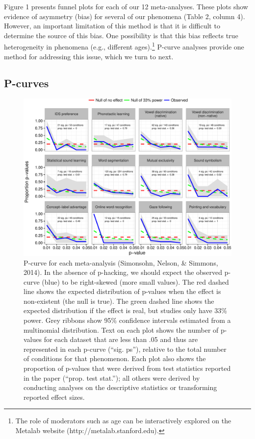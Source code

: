 \documentclass[9pt,twocolumn,twoside,lineno]{pnas-new}
\begin{document}
Figure 1 presents funnel plots for each of our 12 meta-analyses. These
plots show evidence of asymmetry (bias) for several of our phenomena
(Table 2, column 4). However, an important limitation of this method is
that it is difficult to determine the source of this bias. One
possibility is that this bias reflects true heterogeneity in phenomena
(e.g., different
ages).\footnote{The role of moderators such as age can be interactively explored on the Metalab website (http://metalab.stanford.edu).}
P-curve analyses provide one method for addressing this issue, which we
turn to next.



\subsection*{P-curves}\label{p-curves}

\begin{figure}[t!]
\centering
\includegraphics[width=17.3cm]{figs/p_curve_plots-1.pdf}
\caption{P-curve for each meta-analysis (Simonsohn, Nelson, \& Simmons,
2014). In the absence of p-hacking, we should expect the observed
p-curve (blue) to be right-skewed (more small values). The red dashed
line shows the expected distribution of p-values when the effect is
non-existent (the null is true). The green dashed line shows the
expected distribution if the effect is real, but studies only have 33\%
power. Grey ribbons show 95\% confidence intervals estimated from a
multinomial distribution. Text on each plot shows the number of p-values
for each dataset that are less than .05 and thus are represented in each
p-curve (\enquote{sig. ps}), relative to the total number of conditions
for that phenomenon. Each plot also shows the proportion of p-values
that were derived from test statistics reported in the paper
(\enquote{prop. test stat.}); all others were derived by conducting
analyses on the descriptive statistics or transforming reported effect
sizes.}
\end{figure}
\end{document}
